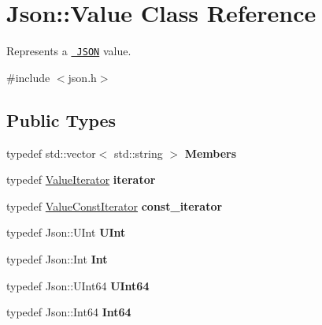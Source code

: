\hypertarget{class_json_1_1_value}{}\section{Json\+::Value Class Reference}
\label{class_json_1_1_value}


Represents a \href{http://www.json.org}{\texttt{ J\+S\+ON}} value.  




{\ttfamily \#include $<$json.\+h$>$}

\subsection*{Public Types}
\begin{DoxyCompactItemize}
\item 
\mbox{\label{class_json_1_1_value_ac61bab5a465848b57610379cc07995c3}} 
typedef std\+::vector$<$ std\+::string $>$ {\bfseries Members}
\item 
\mbox{\label{class_json_1_1_value_a341cdf2e01f8b3c5b7317aa2f0768c53}} 
typedef \mbox{\hyperlink{class_json_1_1_value_iterator}{Value\+Iterator}} {\bfseries iterator}
\item 
\mbox{\label{class_json_1_1_value_af92282ca92b58b320debd486afb7696a}} 
typedef \mbox{\hyperlink{class_json_1_1_value_const_iterator}{Value\+Const\+Iterator}} {\bfseries const\+\_\+iterator}
\item 
\mbox{\label{class_json_1_1_value_a0933d59b45793ae4aade1757c322a98d}} 
typedef Json\+::\+U\+Int {\bfseries U\+Int}
\item 
\mbox{\label{class_json_1_1_value_abdf7a7ff73eb130ffcab28504ffdb405}} 
typedef Json\+::\+Int {\bfseries Int}
\item 
\mbox{\label{class_json_1_1_value_a8b62564be8c087c6d18de180ff4e13e3}} 
typedef Json\+::\+U\+Int64 {\bfseries U\+Int64}
\item 
\mbox{\label{class_json_1_1_value_a1b86af9f85f0f1baa972c3319fa22695}} 
typedef Json\+::\+Int64 {\bfseries Int64}
\item 

\end{DoxyCompactItemize}
